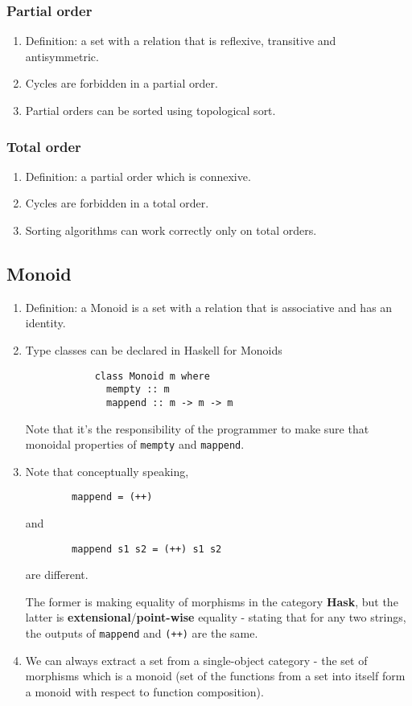\documentclass[titlepage, 12pt]{article}
\begin{document}
\subsubsection{Partial order}
\begin{enumerate}
	\item Definition: a set with a relation that is reflexive, transitive and
		antisymmetric.
	\item Cycles are forbidden in a partial order.
	\item Partial orders can be sorted using topological sort.
\end{enumerate}

\subsubsection{Total order}
\begin{enumerate}
	\item Definition: a partial order which is connexive.
	\item Cycles are forbidden in a total order.
	\item Sorting algorithms can work correctly only on total orders.
\end{enumerate}

\subsection{Monoid}
\begin{enumerate}
	\item Definition: a Monoid is a set with a relation that is associative and
		has an identity.
	\item Type classes can be declared in Haskell for Monoids
		\begin{verbatim}
			class Monoid m where
			  mempty :: m
			  mappend :: m -> m -> m
		\end{verbatim}
		Note that it's the responsibility of the programmer to make sure that
		monoidal properties of \verb#mempty# and \verb#mappend#.
	\item Note that conceptually speaking,
		\begin{verbatim}
		mappend = (++)
		\end{verbatim}
		and
		\begin{verbatim}
		mappend s1 s2 = (++) s1 s2
		\end{verbatim}
		are different.

		The former is making equality of morphisms in the category
		\textbf{Hask}, but the latter is
		\textbf{extensional}/\textbf{point-wise} equality - stating that for any
		two strings, the outputs of
		\verb#mappend# and \verb#(++)# are the same.

	\item We can always extract a set from a single-object category - the set of
		morphisms which is a monoid (set of the functions from a set into itself
		form a monoid with respect to function composition).
\end{enumerate}
\end{document}
